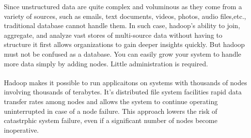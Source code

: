 \documentclass[a4paper,12pt,oneside]{report}
\begin{document}
\par Since unstructured data are quite complex and voluminous as they come from a variety
of sources, such as emails, text documents, videos, photos, audio files,etc., traditional
database cannot handle them. In such case, hadoop’s ability to join, aggregate, and analyze
vast stores of multi-source data without having to structure it first allows organizations to
gain deeper insights quickly. But hadoop must not be confused as a database. You can easily grow your system to handle more data simply by adding nodes. Little administration is required.\\
\\
Hadoop makes it possible to run applicaitons on systems with thousands of nodes involving thousands of terabytes. It's distributed file system facilities rapid
data transfer rates among nodes and allows the system to continue operating uninterrupted in case of a node failure. This approach lowers the risk of catastrphic system failure,
even if a significant number of nodes become inoperative.
\end{document}
